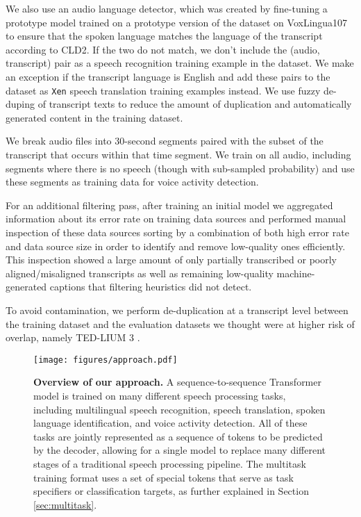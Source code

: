 \documentclass[nohyperref]{article}
\theoremstyle{plain}
\theoremstyle{definition}
\theoremstyle{remark}
\begin{document}
We also use an audio language detector, which was created by fine-tuning a prototype model trained on a prototype version of the dataset on VoxLingua107 \cite{valk2021voxlingua107} to ensure that the spoken language matches the language of the transcript according to CLD2. If the two do not match, we don't include the (audio, transcript) pair as a speech recognition training example in the dataset. We make an exception if the transcript language is English and add these pairs to the dataset as \texttt{Xen} speech translation training examples instead. We use fuzzy de-duping of transcript texts to reduce the amount of duplication and automatically generated content in the training dataset.

We break audio files into 30-second segments paired with the subset of the transcript that occurs within that time segment. We train on all audio, including segments where there is no speech (though with sub-sampled probability) and use these segments as training data for voice activity detection.

For an additional filtering pass, after training an initial model we aggregated information about its error rate on training data sources and performed manual inspection of these data sources sorting by a combination of both high error rate and data source size in order to identify and remove low-quality ones efficiently. This inspection showed a large amount of only partially transcribed or poorly aligned/misaligned transcripts as well as remaining low-quality machine-generated captions that filtering heuristics did not detect.

To avoid contamination, we perform de-duplication at a transcript level between the training dataset and the evaluation datasets we thought were at higher risk of overlap, namely TED-LIUM 3 \cite{Hernandez2018TEDLIUM3T}.

\begin{figure*}[t]
\begin{center}
\centerline{\texttt{[image: figures/approach.pdf]}}
\caption{\textbf{Overview of our approach.} A sequence-to-sequence Transformer model is trained on many different speech processing tasks, including multilingual speech recognition, speech translation, spoken language identification, and voice activity detection. All of these tasks are jointly represented as a sequence of tokens to be predicted by the decoder, allowing for a single model to replace many different stages of a traditional speech processing pipeline. The multitask training format uses a set of special tokens that serve as task specifiers or classification targets, as further explained in Section \ref{sec:multitask}.}
\label{fig:approach}
\end{center}
\vspace{-1em}
\end{figure*}
\end{document}
